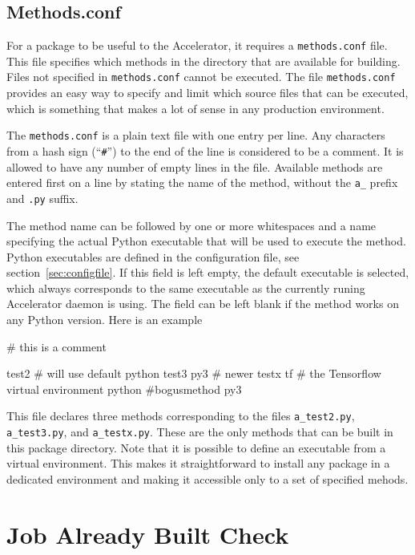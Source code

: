 \subsection{Methods.conf}
\label{sec:methods_conf}
For a package to be useful to the Accelerator, it requires
a \texttt{methods.conf} file.  This file specifies which methods in
the directory that are available for building.  Files not specified
in \texttt{methods.conf} cannot be executed.  The
file \texttt{methods.conf} provides an easy way to specify and limit
which source files that can be executed, which is something that makes
a lot of sense in any production environment.

The \texttt{methods.conf} is a plain text file with one entry per
line.  Any characters from a hash sign (``\texttt{\#}'') to the end of
the line is considered to be a comment.  It is allowed to have any
number of empty lines in the file.  Available methods are entered
first on a line by stating the name of the method, without the
\texttt{a\_} prefix and \texttt{.py} suffix.

The method name can be followed by one or more whitespaces and a name
specifying the actual Python executable that will be used to execute
the method.  Python executables are defined in the configuration file,
see section~\ref{sec:configfile}.  If this field is left empty, the
default executable is selected, which always corresponds to the same
executable as the currently runing Accelerator daemon is using.  The
field can be left blank if the method works on any Python version.
Here is an example

\begin{shell}
# this is a comment

test2                # will use default python
test3           py3  # newer
testx           tf   # the Tensorflow virtual environment python
#bogusmethod    py3
\end{shell}
This file declares three methods corresponding to the files
\texttt{a\_test2.py}, \texttt{a\_test3.py}, and \texttt{a\_testx.py}.
These are the only methods that can be built in this package
directory.  Note that it is possible to define an executable from a
virtual environment.  This makes it straightforward to install any
package in a dedicated environment and making it accessible only to a
set of specified mehods.




\section{Job Already Built Check}


